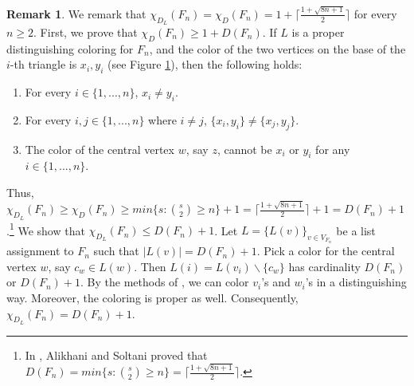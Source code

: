 \documentclass[12pt,reqno,a4paper]{amsart}
\theoremstyle{definition}
\newtheorem{remark}[defn]{Remark}
\begin{document}
\begin{remark}\label{Remark 5.12}
We remark that 
$\chi_{D_{L}}(F_{n}) = \chi_{D}(F_{n}) = 1+\lceil\frac{1+\sqrt{8n+1}}{2}\rceil$ for every $n\geq 2$.
First, we prove that $\chi_{D}(F_{n})\geq 1+D(F_{n})$. If $L$ is a proper distinguishing coloring for $F_{n}$, and the color of the two vertices on the base of the $i$-th triangle is $x_{i}, y_{i}$ (see Figure \ref{Figure 6}), then the following holds:

\begin{enumerate}
    \item For every $i\in \{1,...,n\}$, $x_{i}\neq y_{i}$.
    \item For every $i,j \in \{1,...,n\}$ where $i\neq j$, $\{x_{i}, y_{i}\}\neq \{x_{j}, y_{j}\}$.
    \item The color of the central vertex $w$, say $z$, cannot be $x_{i}$ or $y_{i}$ for any $i\in \{1,...,n\}$.
\end{enumerate}

Thus, $\chi_{D_{L}}(F_{n})\geq\chi_{D}(F_{n})\geq min\{s:\binom{s}{2}\geq n\}+1=\lceil\frac{1+\sqrt{8n+1}}{2}\rceil+1=D(F_{n})+1$.\footnote{In \cite{AS2017}, Alikhani and Soltani proved that $D(F_{n})=min\{s:\binom{s}{2}\geq n\}=\lceil\frac{1+\sqrt{8n+1}}{2}\rceil$.} 
We show that $\chi_{D_{L}}(F_{n})\leq D(F_{n})+1$. 
Let $L=\{L(v)\}_{v\in V_{F_{n}}}$ be a list assignment to $F_{n}$ such that $\vert L(v)\vert =D(F_{n})+1$. Pick a color for the central vertex $w$, say $c_{w}\in L(w)$. Then $L(i)=L(v_{i})\backslash \{c_{w}\} $ has cardinality $D(F_{n})$ or $D(F_{n})+1$. By the methods of \cite{AS}, we can color $v_{i}$'s and $w_{i}$'s in a distinguishing way. Moreover, the coloring is proper as well. Consequently, $\chi_{D_{L}}(F_{n})=D(F_{n})+1$.  

\begin{figure}[!ht]\label{Figure 6}
\centering
\begin{minipage}{\textwidth}
\centering
{}
\end{minipage}
\end{figure}
\end{remark}
\end{document}
